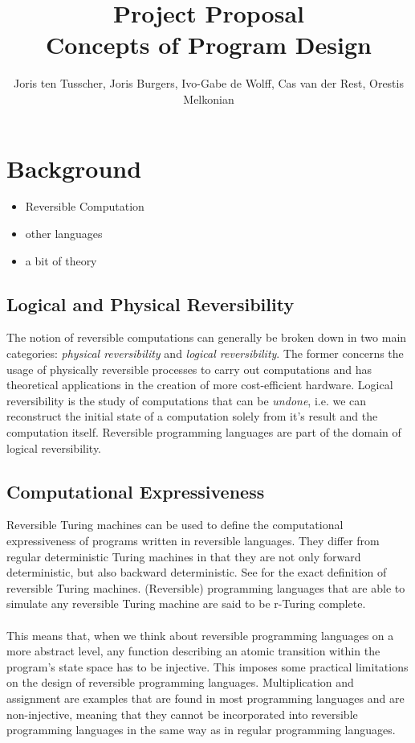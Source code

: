 \documentclass[12pt,a4paper]{article}
\title{\textbf{Project Proposal \\ \small{Concepts of Program Design}}}
\author{\small{Joris ten Tusscher, Joris Burgers, Ivo-Gabe de Wolff, Cas van der Rest, Orestis Melkonian}}
\date{}
\begin{document}
\maketitle

\section{Background}
\begin{itemize}
	\item{Reversible Computation}
	\item{other languages}
	\item{a bit of theory}
\end{itemize}
\subsection{Logical and Physical Reversibility}
	The notion of reversible computations can generally be broken down in two main categories: \textit{physical reversibility} and \textit{logical reversibility}. The former concerns the usage of physically reversible processes to carry out computations and has theoretical applications in the creation of more cost-efficient hardware\cite{frank05}. Logical reversibility is the study of computations that can be \textit{undone}, i.e. we can reconstruct the initial state of a computation solely from it's result and the computation itself. Reversible programming languages are part of the domain of logical reversibility. 
\subsection{Computational Expressiveness}
Reversible Turing machines can be used to define the computational expressiveness of programs written in reversible languages. They differ from regular deterministic Turing machines in that they are not only forward deterministic, but also backward deterministic. See \cite{axelsen11} for the exact definition of reversible Turing machines. (Reversible) programming languages that are able to simulate any reversible Turing machine are said to be r-Turing complete. \\ \\
This means that, when we think about reversible programming languages on a more abstract level, any function describing an atomic transition within the program's state space has to be injective. This imposes some practical limitations on the design of reversible programming languages. Multiplication and assignment are examples that are found in most programming languages and are non-injective, meaning that they cannot be incorporated into reversible programming languages in the same way as in regular programming languages.  
\end{document}
